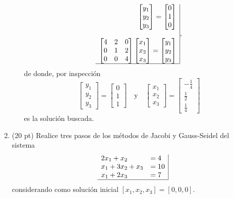 \documentclass[11pt]{article}
\begin{document}
\begin{enumerate}
\begin{enumerate}
$$\begin{array}{r|}
\begin{bmatrix}
y_1\\y_2\\y_3
\end{bmatrix}
=
\begin{bmatrix}
0\\1\\0
\end{bmatrix} \\ \\
              \begin{bmatrix}
              4 & 2 			& 0		\\
              0 & 1  			& 2 	\\
              0 & 0 			& 4
              \end{bmatrix}
              \begin{bmatrix}
              x_1\\x_2\\x_3
              \end{bmatrix}
              =
              \begin{bmatrix}
              y_1\\y_2\\y_3
              \end{bmatrix}\\ 
\hline
\end{array},
$$
de donde, por inspecci\'on
$$
\begin{bmatrix}
y_1\\y_2\\y_3
\end{bmatrix}
=
              \begin{bmatrix}
              0\\1\\1
              \end{bmatrix}
              \quad \text{y} \quad
\begin{bmatrix}
x_1\\x_2\\x_3
\end{bmatrix}
=
              \begin{bmatrix}
              -\frac{1}{4}\\ \frac{1}{2} \\ \frac{1}{4}
              \end{bmatrix}              
$$
es la soluci\'on buscada. \fbox{10 pt}
\end{enumerate}

\newpage
\item (20 pt) Realice tres pasos de los m\'etodos de Jacobi y Gauss-Seidel del sistema
$$
\begin{array}{ll|}
2x_1+x_2 	& = 4\\
x_1+3x_2+x_3& =10\\
x_1+2x_3	& =7 \\
\hline
\end{array}
$$
considerando como soluci\'on inicial $[x_1,x_2,x_3] = [0,0,0]$.


\end{enumerate}
\end{document}
